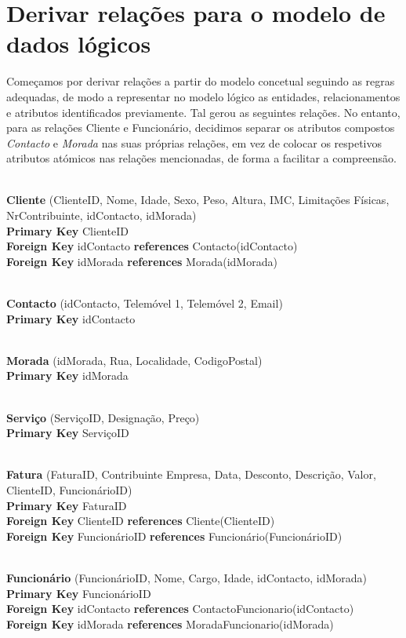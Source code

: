 \section{Derivar relações para o modelo de dados lógicos}

Começamos por derivar relações a partir do modelo concetual seguindo as regras adequadas, de modo a representar no modelo lógico as entidades, relacionamentos e atributos identificados previamente. Tal gerou as seguintes relações. No entanto, para as relações Cliente e Funcionário, decidimos separar os atributos compostos \emph{Contacto} e \emph{Morada} nas suas próprias relações, em vez de colocar os respetivos atributos atómicos nas relações mencionadas, de forma a facilitar a compreensão.


\noindent
\\\textbf{Cliente} (ClienteID,  Nome, Idade, Sexo, Peso, Altura, IMC, Limitações Físicas,  NrContribuinte, idContacto, idMorada)
\\\textbf{Primary Key} ClienteID
\\\textbf{Foreign Key} idContacto \textbf{references} Contacto(idContacto)
\\\textbf{Foreign Key} idMorada \textbf{references} Morada(idMorada)

\noindent
\\\textbf{Contacto} (idContacto, Telemóvel 1, Telemóvel 2, Email)
\\\textbf{Primary Key} idContacto

\noindent
\\\textbf{Morada} (idMorada, Rua, Localidade, CodigoPostal)
\\\textbf{Primary Key} idMorada

\noindent
\\\textbf{Serviço} (ServiçoID, Designação, Preço)
\\\textbf{Primary Key} ServiçoID

\noindent
\\\textbf{Fatura} (FaturaID, Contribuinte Empresa, Data, Desconto, Descrição, Valor, ClienteID, FuncionárioID)
\\\textbf{Primary Key} FaturaID
\\\textbf{Foreign Key} ClienteID \textbf{references} Cliente(ClienteID)
\\\textbf{Foreign Key} FuncionárioID \textbf{references} Funcionário(FuncionárioID)

\noindent
\\\textbf{Funcionário} (FuncionárioID, Nome, Cargo, Idade, idContacto, idMorada)
\\\textbf{Primary Key} FuncionárioID
\\\textbf{Foreign Key} idContacto \textbf{references} ContactoFuncionario(idContacto)
\\\textbf{Foreign Key} idMorada \textbf{references} MoradaFuncionario(idMorada)

